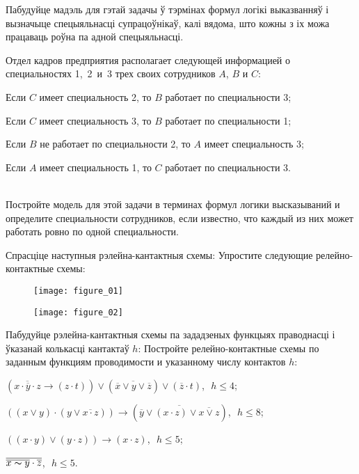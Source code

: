 \begin{problemList}
{Пабудуйце мадэль для гэтай задачы ў тэрмінах формул логікі выказванняў і вызначыце спецыяльнасці супрацоўнікаў,
калі вядома, што кожны з іх можа працаваць роўна па адной спецыяльнасці.
}
{%
Отдел кадров предприятия располагает следующей информацией о специальностях 1,~2~и~3 трех своих сотрудников $A$, $B$ и $C$:
\begin{russianEnumerate}
    \item Если $C$ имеет специальность 2, то $B$ работает по специальности 3;
    \item Если $C$ имеет специальность 3, то $B$ работает по специальности 1;
    \item Если $B$ не работает по специальности 2, то $A$ имеет специальность 3;
    \item Если $A$ имеет специальность 1, то $C$ работает по специальности 3.
\end{russianEnumerate}\\
Постройте модель для этой задачи в терминах формул логики высказываний и определите  специальности сотрудников,
если известно, что каждый из них может работать ровно по  одной специальности.
}

\bigskip

\problemItemWithCommonPart
{Спрасціце наступныя рэлейна-кантактныя схемы:}
{Упростите следующие релейно-контактные схемы:}
{%
\begin{figure}[H]
    \begin{center}
        \texttt{[image: figure\_01]}
    \end{center}
\end{figure}

\begin{figure}[H]
    \begin{center}
        \texttt{[image: figure\_02]}
    \end{center}
\end{figure}
}

\problemItemWithCommonPart
{Пабудуйце рэлейна-кантактныя схемы па зададзеных функцыях праводнасці і ўказанай колькасці кантактаў $h$:}
{Постройте релейно-контактные схемы по заданным функциям проводимости и указанному числу контактов $h$:}
{%
\begin{belarusianEnumerate}
    \item $(\overline{x \cdot \overline{y} \cdot z} \to (z \cdot t)) \vee
    (\overline{\overline{x} \vee y \vee \overline{z}}) \vee (\overline{z} \cdot t)$,\,\, $h \le 4$;
    \item $((x \vee y) \cdot (y \vee \overline{x \cdot z})) \to (\overline{\overline{y} \vee
    (x \cdot z) \vee \overline{x \vee z}})$,\,\, $h \le 8$;
    \item $((x \cdot y) \vee (y \cdot z)) \to (x \cdot z)$,\,\, $h \le 5$;
    \item $\overline{\overline{x \thicksim y} \cdot \overline{z}}$,\,\, $h \le 5$.
\end{belarusianEnumerate}
}


\end{problemList}
